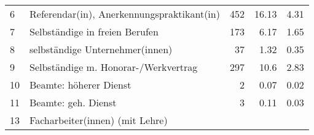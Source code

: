 \begin{longtable}{lXrrr}
     6 &
     \multicolumn{1}{X}{ Referendar(in), Anerkennungspraktikant(in)   } &


       \num{452} &
       \num[round-mode=places,round-precision=2]{16,13} &
         \num[round-mode=places,round-precision=2]{4,31} \\

     7 &
     \multicolumn{1}{X}{ Selbständige in freien Berufen   } &


       \num{173} &
       \num[round-mode=places,round-precision=2]{6,17} &
         \num[round-mode=places,round-precision=2]{1,65} \\

     8 &
     \multicolumn{1}{X}{ selbständige Unternehmer(innen)   } &


       \num{37} &
       \num[round-mode=places,round-precision=2]{1,32} &
         \num[round-mode=places,round-precision=2]{0,35} \\

     9 &
     \multicolumn{1}{X}{ Selbständige m. Honorar-/Werkvertrag   } &


       \num{297} &
       \num[round-mode=places,round-precision=2]{10,6} &
         \num[round-mode=places,round-precision=2]{2,83} \\

     10 &
     \multicolumn{1}{X}{ Beamte: höherer Dienst   } &


       \num{2} &
       \num[round-mode=places,round-precision=2]{0,07} &
         \num[round-mode=places,round-precision=2]{0,02} \\

     11 &
     \multicolumn{1}{X}{ Beamte: geh. Dienst   } &


       \num{3} &
       \num[round-mode=places,round-precision=2]{0,11} &
         \num[round-mode=places,round-precision=2]{0,03} \\

     13 &
     \multicolumn{1}{X}{ Facharbeiter(innen) (mit Lehre)   } &



\end{longtable}
